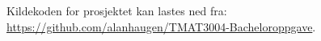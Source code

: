 Kildekoden for prosjektet kan lastes ned fra: \\ \url{https://github.com/alanhaugen/TMAT3004-Bacheloroppgave}.







